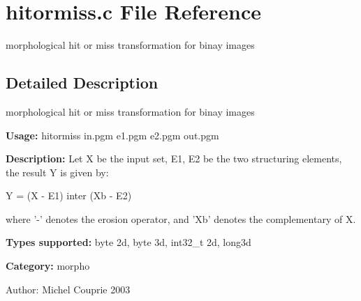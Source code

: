 \section{hitormiss.c File Reference}
\label{hitormiss_8c}
morphological hit or miss transformation for binay images  




\label{_details}
\subsection{Detailed Description}
morphological hit or miss transformation for binay images 

{\bf Usage:} hitormiss in.pgm e1.pgm e2.pgm out.pgm

{\bf Description:} Let X be the input set, E1, E2 be the two structuring elements, the result Y is given by:\par
 Y = (X - E1) inter (Xb - E2)\par
 where '-' denotes the erosion operator, and 'Xb' denotes the complementary of X.

{\bf Types supported:} byte 2d, byte 3d, int32\_\-t 2d, long3d

{\bf Category:} morpho

\begin{Desc}
\item[Author:]Michel Couprie 2003 \end{Desc}
